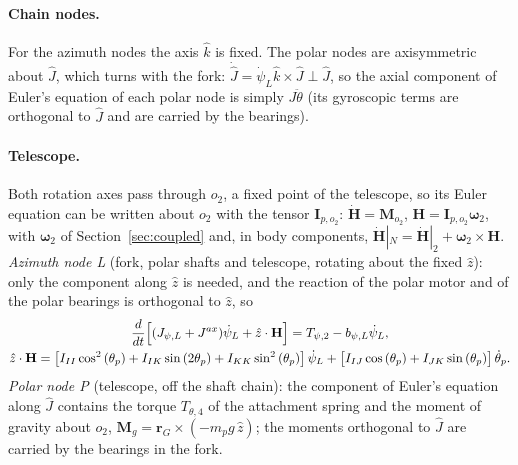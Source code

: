 \documentclass[10pt,a4paper]{article}
\numberwithin{equation}{section}
\begin{document}
\paragraph{Chain nodes.} For the azimuth nodes the axis $\hat k$ is fixed. The polar nodes are axisymmetric about $\hat J$, which turns with the fork: $\dot{\hat J} = \dot\psi_L\hat k\times\hat J\perp\hat J$, so the axial component of Euler's equation of each polar node is simply $J\ddot\theta$ (its gyroscopic terms are orthogonal to $\hat J$ and are carried by the bearings).
\paragraph{Telescope.} Both rotation axes pass through $o_2$, a fixed point of the telescope, so its Euler equation can be written about $o_2$ with the tensor $\mathbf I_{p,o_2}$: $\dot{\mathbf H} = \mathbf M_{o_2}$, $\mathbf H = \mathbf I_{p,o_2}\boldsymbol\omega_2$, with $\boldsymbol\omega_2$ of Section~\ref{sec:coupled} and, in body components, $\dot{\mathbf H}|_N = \dot{\mathbf H}|_2 + \boldsymbol\omega_2\times\mathbf H$. \emph{Azimuth node L} (fork, polar shafts and telescope, rotating about the fixed $\hat z$): only the component along $\hat z$ is needed, and the reaction of the polar motor and of the polar bearings is orthogonal to $\hat z$, so
\begin{gather}
\frac{d}{dt}\Bigl[(J_{\psi,L} + J^{ax})\dot\psi_L + \hat z\cdot\mathbf H\Bigr] = T_{\psi,2} - b_{\psi,L}\dot\psi_L,\\
\hat z\cdot\mathbf H = \bigl[I_{II} \cos^{2}{\left(\theta_{p} \right)} + I_{IK} \sin{\left(2 \theta_{p} \right)} + I_{KK} \sin^{2}{\left(\theta_{p} \right)}\bigr]\,\dot\psi_L + \bigl[I_{IJ} \cos{\left(\theta_{p} \right)} + I_{JK} \sin{\left(\theta_{p} \right)}\bigr]\,\dot\theta_p.
\end{gather}
\emph{Polar node P} (telescope, off the shaft chain): the component of Euler's equation along $\hat J$ contains the torque $T_{\theta,4}$ of the attachment spring and the moment of gravity about $o_2$, $\mathbf M_g = \mathbf r_{G} \times (-m_p g\,\hat z)$; the moments orthogonal to $\hat J$ are carried by the bearings in the fork.
\end{document}
